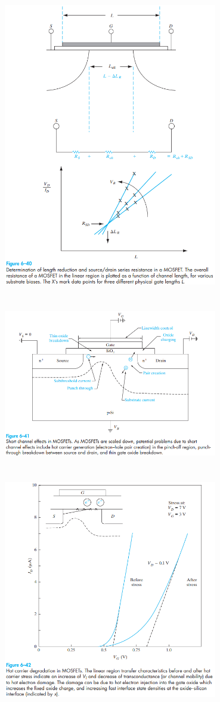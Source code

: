 \documentclass[8pt]{article}
\newcommand{\hl}{\noindent\makebox[\linewidth]{\rule{\textwidth}{0.2pt}}}
\begin{document}
\begin{center}
		\includegraphics[width=0.7\textwidth]{fig6-40} \\ \hl \\~\\
		\includegraphics[width=0.7\textwidth]{fig6-41} \\ \hl \\~\\
		\includegraphics[width=0.7\textwidth]{fig6-42} \\ \hl \\~\\

\end{center}
\end{document}
